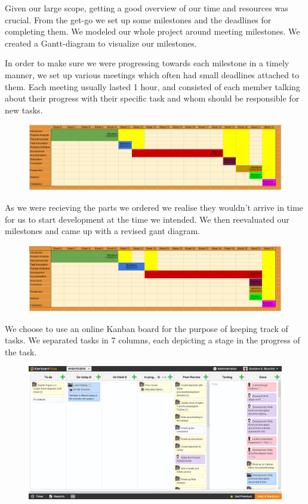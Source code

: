 Given our large scope, getting a good overview of our time and resources was crucial. From the get-go we set up some milestones and the deadlines for completing them. We modeled our whole project around meeting milestones. We created a Gantt-diagram to visualize our milestones.

In order to make sure we were progressing towards each milestone in a timely manner, we set up various meetings which often had small deadlines attached to them. Each meeting usually lasted 1 hour, and consisted of each member talking about their progress with their specific task and whom should be responsible for new tasks.

\begin{figure}[H]
	\centering
	\includegraphics[scale=.4]{images/gantt1.png}
	\caption{}
\end{figure}

As we were recieving the parts we ordered we realise they wouldn't arrive in time for us to start development at the time we intended. We then reevaluated our milestones and came up with a revised gant diagram.

\begin{figure}[H]
	\centering
	\includegraphics[scale=.4]{images/gantt2.png}
	\caption{}
\end{figure}

We choose to use an online Kanban board for the purpose of keeping track of tasks. We separated tasks in 7 columns, each depicting a stage in the progress of the task.

\begin{figure}[H]
	\centering
	\includegraphics[scale=.4]{images/kanban.png}
	\caption{}
\end{figure}


